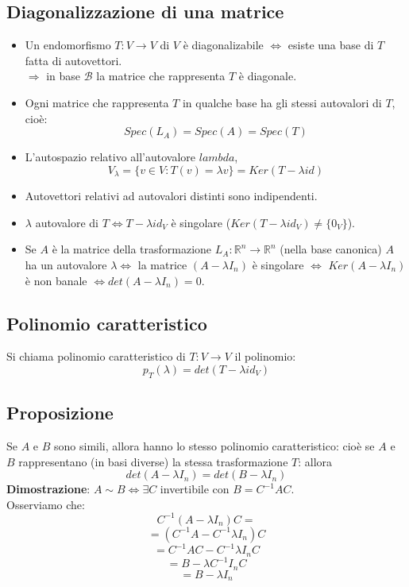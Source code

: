 \subsection{Diagonalizzazione di una matrice}
\begin{itemize}
\item Un endomorfismo $T:V\rightarrow V$ di $V$ è diagonalizabile $\Leftrightarrow$ esiste una base di $T$ fatta di autovettori.
  \\$\Rightarrow$ in base $\mathcal{B}$ la matrice che rappresenta $T$ è diagonale.

\item Ogni matrice che rappresenta $T$ in qualche base ha gli stessi autovalori di $T$, cioè:
  \[Spec(L_A)=Spec(A)=Spec(T)\]

\item L'autospazio relativo all'autovalore $lambda $,
  \[V_\lambda=\{v\in V: T(v)=\lambda v\}=Ker(T-\lambda id)\]

\item Autovettori relativi ad autovalori distinti sono indipendenti.

\item $\lambda$ autovalore di $T\Leftrightarrow T-\lambda id_V$ è singolare ($Ker(T-\lambda id_V)\neq\{0_V\}$).

\item Se $A$ è la matrice della trasformazione $L_A:\mathbb{R}^n\rightarrow\mathbb{R}^n$ (nella base canonica) $A$ ha un autovalore $\lambda\Leftrightarrow$ la matrice $(A-\lambda I_n)$ è singolare $\Leftrightarrow$ $Ker(A-\lambda I_n)$ è non banale $\Leftrightarrow det(A-\lambda I_n)=0$.
  
\end{itemize}

\subsection{Polinomio caratteristico}
Si chiama polinomio caratteristico di $T:V\rightarrow V$ il polinomio:
\[p_T(\lambda)=det(T-\lambda id_V)\]

\subsection{Proposizione}
Se $A$ e $B$ sono simili, allora hanno lo stesso polinomio caratteristico: cioè se $A$ e $B$ rappresentano (in basi diverse) la stessa trasformazione $T$: allora
\[det(A-\lambda I_n)=det(B-\lambda I_n)\]
\textbf{Dimostrazione}: $A\sim B\Leftrightarrow \exists C$ invertibile con $B=C^{-1}AC$.
\\Osserviamo che:
\[C^{-1}(A-\lambda I_n)C=\]
\[=(C^{-1}A-C^{-1}\lambda I_n)C\]
\[=C^{-1}AC-C^{-1}\lambda I_nC\]
\[=B-\lambda C^{-1}I_n C\]
\[=B-\lambda I_n\]


